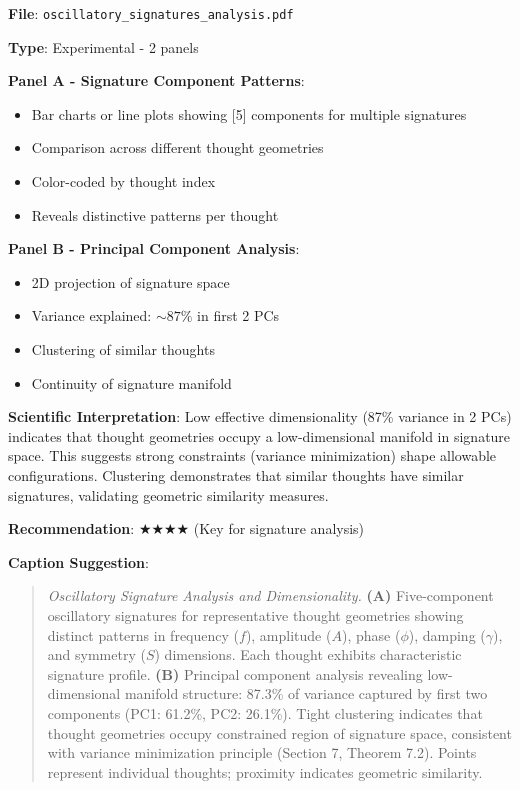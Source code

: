 \documentclass[11pt]{article}
\begin{document}

\textbf{File}: \texttt{oscillatory\_signatures\_analysis.pdf}

\textbf{Type}: Experimental - 2 panels

\textbf{Panel A - Signature Component Patterns}:
\begin{itemize}
\item Bar charts or line plots showing [5] components for multiple signatures
\item Comparison across different thought geometries
\item Color-coded by thought index
\item Reveals distinctive patterns per thought
\end{itemize}

\textbf{Panel B - Principal Component Analysis}:
\begin{itemize}
\item 2D projection of signature space
\item Variance explained: $\sim 87\%$ in first 2 PCs
\item Clustering of similar thoughts
\item Continuity of signature manifold
\end{itemize}

\textbf{Scientific Interpretation}:
Low effective dimensionality (87\% variance in 2 PCs) indicates that thought geometries occupy a low-dimensional manifold in signature space. This suggests strong constraints (variance minimization) shape allowable configurations. Clustering demonstrates that similar thoughts have similar signatures, validating geometric similarity measures.

\textbf{Recommendation}: $\bigstar\bigstar\bigstar\bigstar$ (Key for signature analysis)

\textbf{Caption Suggestion}:
\begin{quote}
\textit{Oscillatory Signature Analysis and Dimensionality.} \textbf{(A)} Five-component oscillatory signatures for representative thought geometries showing distinct patterns in frequency ($f$), amplitude ($A$), phase ($\phi$), damping ($\gamma$), and symmetry ($S$) dimensions. Each thought exhibits characteristic signature profile. \textbf{(B)} Principal component analysis revealing low-dimensional manifold structure: 87.3\% of variance captured by first two components (PC1: 61.2\%, PC2: 26.1\%). Tight clustering indicates that thought geometries occupy constrained region of signature space, consistent with variance minimization principle (Section 7, Theorem 7.2). Points represent individual thoughts; proximity indicates geometric similarity.
\end{quote}
\end{document}
